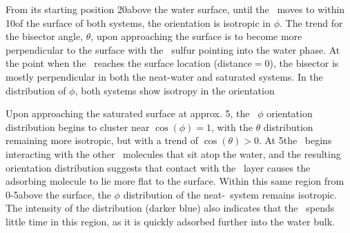 	From its starting position 20\angs above the water surface, until the \suldiox~moves to within 10\angs of the surface of both systems, the orientation is isotropic in $\phi$. The trend for the bisector angle, $\theta$, upon approaching the surface is to become more perpendicular to the surface with the \suldiox~sulfur pointing into the water phase. At the point when the \suldiox~reaches the surface location (distance$=0$), the bisector is mostly perpendicular in both the neat-water and saturated systems. In the distribution of $\phi$, both systems show isotropy in the orientation
 
  Upon approaching the saturated surface at approx. 5\angs, the \suldiox~$\phi$ orientation distribution begins to cluster near $\cos(\phi)=1$, with the $\theta$ distribution remaining more isotropic, but with a trend of $\cos(\theta)>0$. At 5\angs the \suldiox~begins interacting with the other \suldiox~molecules that sit atop the water, and the resulting orientation distribution suggests that contact with the \suldiox~layer causes the adsorbing molecule to lie more flat to the surface. Within this same region from 0-5\angs above the surface, the $\phi$ distribution of the neat-\wat~system remains isotropic. The intensity of the distribution (darker blue) also indicates that the \suldiox~spends little time in this region, as it is quickly adsorbed further into the water bulk.


